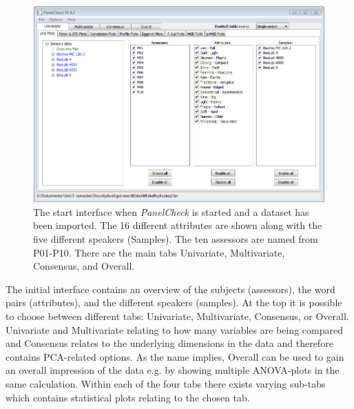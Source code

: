 \begin{figure}
\includegraphics[width = \textwidth]{Figure/PanelCheck.png}
\caption{The start interface when \textit{PanelCheck} is started and a dataset has been imported. The 16 different attributes are shown along with the five different speakers (Samples). The ten assessors are named from P01-P10. There are the main tabs Univariate, Multivariate, Consensus, and Overall.}
\label{fig:PanelCheck}
\end{figure}

The initial interface contains an overview of the subjects (assessors), the word pairs (attributes), and the different speakers (samples). At the top it is possible to choose between different tabs: Univariate, Multivariate, Consensus, or Overall. Univariate and Multivariate relating to how many variables are being compared and Consensus relates to the underlying dimensions in the data and therefore contains PCA-related options. As the name implies, Overall can be used to gain an overall impression of the data e.g. by showing multiple ANOVA-plots in the same calculation. Within each of the four tabs there exists varying sub-tabs which contains statistical plots relating to the chosen tab.